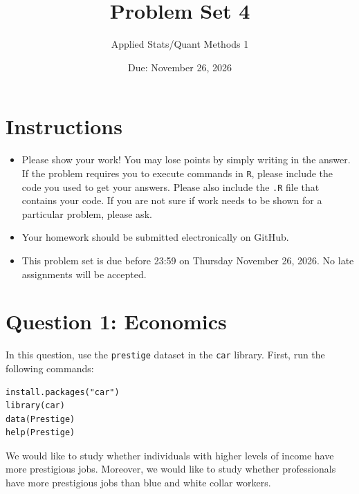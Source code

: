 \documentclass[12pt,letterpaper]{article}
\title{Problem Set 4}
\date{Due: November 26, 2026}
\author{Applied Stats/Quant Methods 1}
\begin{document}
	\maketitle
	\section*{Instructions}
	\begin{itemize}
		\item Please show your work! You may lose points by simply writing in the answer. If the problem requires you to execute commands in \texttt{R}, please include the code you used to get your answers. Please also include the \texttt{.R} file that contains your code. If you are not sure if work needs to be shown for a particular problem, please ask.
		\item Your homework should be submitted electronically on GitHub.
		\item This problem set is due before 23:59 on Thursday November 26, 2026. No late assignments will be accepted.
	\end{itemize}



	\vspace{.5cm}
\section*{Question 1: Economics}
\vspace{.25cm}
\noindent 	
In this question, use the \texttt{prestige} dataset in the \texttt{car} library. First, run the following commands:

\begin{verbatim}
install.packages("car")
library(car)
data(Prestige)
help(Prestige)
\end{verbatim} 


\noindent We would like to study whether individuals with higher levels of income have more prestigious jobs. Moreover, we would like to study whether professionals have more prestigious jobs than blue and white collar workers.
\end{document}
